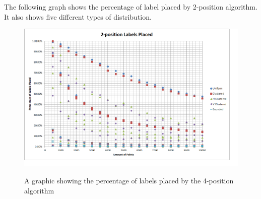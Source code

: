 \documentclass[crop=false,a4paper,oneside,11pt]{standalone}
\begin{document}
The following graph shows the percentage of label placed by 2-position algorithm. It also shows five different types of distribution.
\begin{figure}[h!]
 \centering
  \includegraphics[scale = 0.5]{2PosLabelsPlaced.png}\\
  \caption{A graphic showing the percentage of labels placed by the 4-position algorithm}
 \end{figure}
\end{document}

